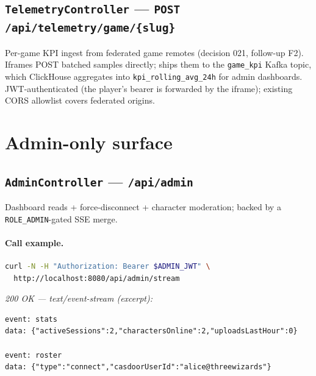 \subsection{\texttt{TelemetryController} — \texttt{POST /api/telemetry/game/\{slug\}}}
Per-game KPI ingest from federated game remotes (decision 021,
follow-up F2). Iframes POST batched samples directly;
 ships them to the \texttt{game\_kpi} Kafka
topic, which ClickHouse aggregates into \texttt{kpi\_rolling\_avg\_24h}
for admin dashboards. JWT-authenticated (the player's bearer is
forwarded by the iframe); existing  CORS allowlist
covers federated origins.

\section{Admin-only surface}

\subsection{\texttt{AdminController} — \texttt{/api/admin}}
Dashboard reads + force-disconnect + character moderation; backed by a
\texttt{ROLE\_ADMIN}-gated SSE merge.


\paragraph{Call example.}
\begin{lstlisting}[language=bash]
curl -N -H "Authorization: Bearer $ADMIN_JWT" \
  http://localhost:8080/api/admin/stream
\end{lstlisting}
\textit{200 OK — text/event-stream (excerpt):}
\begin{lstlisting}
event: stats
data: {"activeSessions":2,"charactersOnline":2,"uploadsLastHour":0}

event: roster
data: {"type":"connect","casdoorUserId":"alice@threewizards"}
\end{lstlisting}

